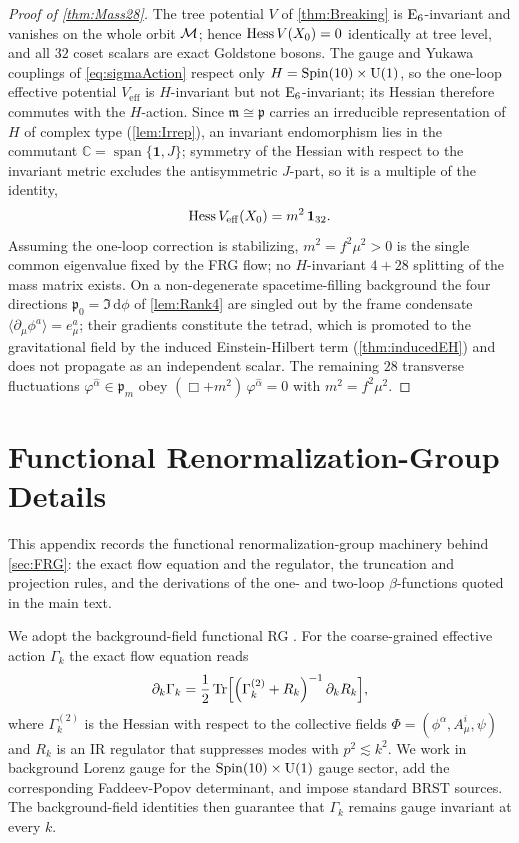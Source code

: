 \documentclass[pdflatex,sn-mathphys-num]{sn-jnl}
\theoremstyle{thmstyleone}
\theoremstyle{thmstylethree}%
\theoremstyle{thmstyletwo}%
\begin{document}
\begin{appendices}
\begin{proof}[Proof of \autoref{thm:Mass28}]
The tree potential \(V\) of \autoref{thm:Breaking} is \(\mathrm{E}_{6}\)-invariant and
vanishes on the whole orbit \(\mathcal{M}\); hence \(\operatorname{Hess} V(X_{0})=0\) identically at
tree level, and all \(32\) coset scalars are exact Goldstone bosons. The gauge
and Yukawa couplings of \eqref{eq:sigmaAction} respect only
\(H=\operatorname{Spin}(10) \times \mathrm{U(1)}\), so the one-loop effective potential
\(V_{\mathrm{eff}}\) is \(H\)-invariant but not \(\mathrm{E}_{6}\)-invariant; its Hessian
therefore commutes with the \(H\)-action. Since \(\mathfrak m\cong\mathfrak p\)
carries an irreducible representation of \(H\) of complex type
(\autoref{lem:Irrep}), an invariant endomorphism lies in the commutant
\(\mathbb C=\operatorname{span}\{\mathbf 1,J\}\); symmetry of the Hessian with
respect to the invariant metric excludes the antisymmetric \(J\)-part, so it is
a multiple of the identity,
\[
  \operatorname{Hess} V_{\mathrm{eff}}(X_{0}) = m^{2}\,\mathbf1_{32}.
\]
Assuming the one-loop correction is stabilizing, \(m^{2}=f^{2}\mu^{2}>0\) is the
single common eigenvalue fixed by the FRG flow; no
\(H\)-invariant \(4+28\) splitting of the mass matrix exists. On a non-degenerate
spacetime-filling background the four directions
\(\mathfrak p_{0}=\Im\,\mathrm d\phi\) of \autoref{lem:Rank4} are singled out by
the frame condensate \(\langle\partial_\mu\phi^{a}\rangle=e_\mu^{a}\);
their gradients constitute the tetrad, which is promoted to the gravitational
field by the induced Einstein-Hilbert term (\autoref{thm:inducedEH}) and does
not propagate as an independent scalar. The remaining \(28\) transverse
fluctuations \(\varphi^{\hat\alpha}\in\mathfrak p_{m}\) obey
\((\Box+m^{2})\,\varphi^{\hat\alpha}=0\) with
\(m^{2}=f^{2}\mu^{2}\).
\end{proof}


\section{Functional Renormalization-Group Details}
\label{app:FRG}

This appendix records the functional renormalization-group machinery behind
\autoref{sec:FRG}: the exact flow equation and the regulator, the truncation
and projection rules, and the derivations of the one- and two-loop
$\beta$-functions quoted in the main text.

We adopt the background-field functional RG \cite{Wetterich1993,Morris1994}.  
For the coarse-grained effective action $\Gamma_{k}$ the exact flow
equation reads
\[
  \partial_{k}\Gamma_{k}
  =\frac12\operatorname{Tr}\Bigl[
    \Bigl(\Gamma_{k}^{(2)}+R_{k}\Bigr)^{-1}
    \,\partial_{k}R_{k}\Bigr],
\]
where $\Gamma_{k}^{(2)}$ is the Hessian with respect to the collective
fields
$\Phi=(\phi^{\alpha},A_{\mu}^{i},\psi)$
and $R_{k}$ is an IR regulator that suppresses modes
with $p^{2}\lesssim k^{2}$.
We work in background Lorenz gauge for the $\operatorname{Spin}(10) \times \mathrm{U(1)}$ gauge sector,
add the corresponding Faddeev-Popov determinant, and impose standard
BRST sources. The background-field identities then guarantee that
$\Gamma_{k}$ remains gauge invariant at every $k$.


\end{appendices}
\end{document}
